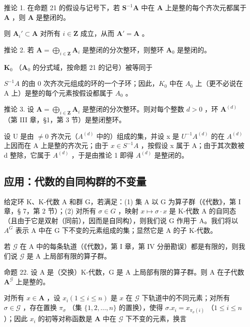 推论 1. 在命题 21 的假设与记号下，若 \(\mathbf{S}^{-1}\mathbf{A}\) 中在 \(\mathbf{A}\) 上是整的每个齐次元都属于 \(\mathbf{A}\) ，则 \(\mathbf{A}\) 是整闭的。

则 \(\mathbf{A}_i' \subset \mathbf{A}\) 对所有 \(i \in \mathbf{Z}\) 成立，从而 \(\mathbf{A}' = \mathbf{A}\) 。

推论 2. 若 \(\mathbf{A} = \bigoplus_{i\in \mathbf{Z}}\mathbf{A}_i\) 是整闭的分次整环，则整环 \(\mathbf{A}_0\) 是整闭的。

\(\mathbf{K}_0\) （\(\mathbf{A}_0\) 的分式域，按命题 21 的记号）被等同于

\(S^{-1}A\) 的由 0 次齐次元组成的环的一个子环；因此，\(K_{0}\) 中在 \(A_{0}\) 上（更不必说在 A 上）是整的每个元素按假设都属于 \(A_{0}\) 。

推论 3. 设 \(\mathbf{A} = \bigoplus_{i\in \mathbf{Z}}\mathbf{A}_i\) 是整闭的分次整环。则对每个整数 \(d > 0\) ，环 \(\mathbf{A}^{(d)}\) （第 III 章，§1，第 3 节）是整闭整环。

设 U 是由 \(\neq0\) 齐次元（\(A^{(d)}\) 中的）组成的集，并设 x 是 \(U^{-1}A^{(d)}\) 的在 \(A^{(d)}\) 上因而在 A 上是整的齐次元；由于 \(x\in S^{-1}A\) ，按假设 x 属于 A；由于其次数被 d 整除，它属于 \(A^{(d)}\) ，于是由推论 1 即得 \(A^{(d)}\) 是整闭的。

\subsection{应用：代数的自同构群的不变量}

给定环 K、K-代数 A 和群 G，若满足：(1) 集 A 以 G 为算子群（《代数》，第 I 章，§ 7，第 2 节）；(2) 对所有 \(\sigma \in G\) ，映射 \(x \mapsto \sigma \cdot x\) 是 K-代数 A 的自同态（且由于它是双射（同前），因而是自同构），则我们说 G 作用于 A。我们将以 \(A^{G}\) 表示 A 中在 G 下不变的元素组成的集；显然它是 A 的子 K-代数。

若 \(\mathcal{G}\) 在 A 中的每条轨道（《代数》，第 I 章，第 IV 分册勘误）都是有限的，则我们说 \(\mathcal{G}\) 是 A 上局部有限的算子群。

命题 22. 设 A 是（交换）K-代数，G 是 A 上局部有限的算子群。则 A 在子代数 \(\mathbf{A}^{\mathcal{G}}\) 上是整的。

对所有 \(x \in \mathbf{A}\) ，设 \(x_{i} (1 \leqslant i \leqslant n)\) 是 \(x\) 在 \(\mathcal{G}\) 下轨道中的不同元素；对所有 \(\sigma \in \mathcal{G}\) ，存在置换 \(\pi_{\sigma}\) （集 \(\{1, 2, \ldots, n\}\) 的置换），使得 \(\sigma. x_{i} = x_{\pi_{\sigma}(i)}\) （\(1 \leqslant i \leqslant n\)）；因此 \(x_{i}\) 的初等对称函数是 \(\mathbf{A}\) 中在 \(\mathcal{G}\) 下不变的元素，换言

